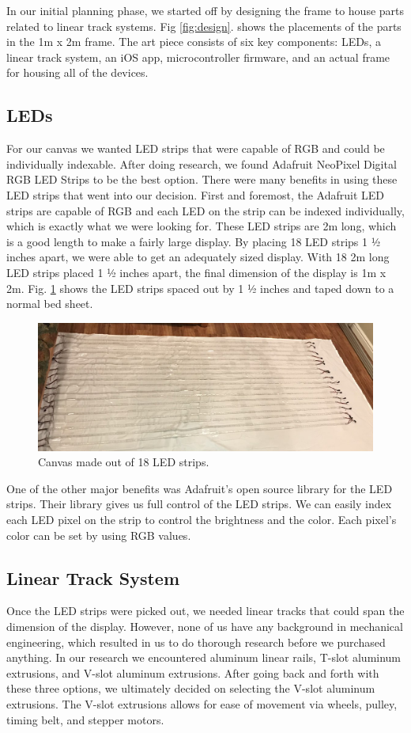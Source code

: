 \documentclass[11pt]{IEEEtran}
\begin{document}
In our initial planning phase, we started off by designing the frame to house parts related to linear track systems. Fig \ref{fig:design}. shows the placements of the parts in the 1m x 2m frame. The art piece consists of six key components: LEDs, a linear track system, an iOS app, microcontroller firmware, and an actual frame for housing all of the devices.

\subsection{LEDs}
For our canvas we wanted LED strips that were capable of RGB and could be individually indexable. After doing research, we found Adafruit NeoPixel Digital RGB LED Strips to be the best option. There were many benefits in using these LED strips that went into our decision. First and foremost, the Adafruit LED strips are capable of RGB and each LED on the strip can be indexed individually, which is exactly what we were looking for. These LED strips are 2m long, which is a good length to make a fairly large display. By placing 18 LED strips 1 ½ inches apart, we were able to get an adequately sized display. With 18 2m long LED strips placed 1 ½ inches apart, the final dimension of the display is 1m x 2m. Fig. \ref{fig:ledstripsonsheet} shows the LED strips spaced out by 1 ½ inches and taped down to a normal bed sheet.

\begin{figure}[H]
  \centering
  \includegraphics[width=\columnwidth]{image6.png}
  \caption{Canvas made out of 18 LED strips.}
  \label{fig:ledstripsonsheet}
\end{figure}

One of the other major benefits was Adafruit’s open source library for the LED strips. Their library gives us full control of the LED strips. We can easily index each LED pixel on the strip to control the brightness and the color. Each pixel’s color can be set by using RGB values.

\subsection{Linear Track System}
Once the LED strips were picked out, we needed linear tracks that could span the dimension of the display. However, none of us have any background in mechanical engineering, which resulted in us to do thorough research before we purchased anything. In our research we encountered aluminum linear rails, T-slot aluminum extrusions, and V-slot aluminum extrusions. After going back and forth with these three options, we ultimately decided on selecting the V-slot aluminum extrusions. The V-slot extrusions allows for ease of movement via wheels, pulley, timing belt, and stepper motors. 
\end{document}
